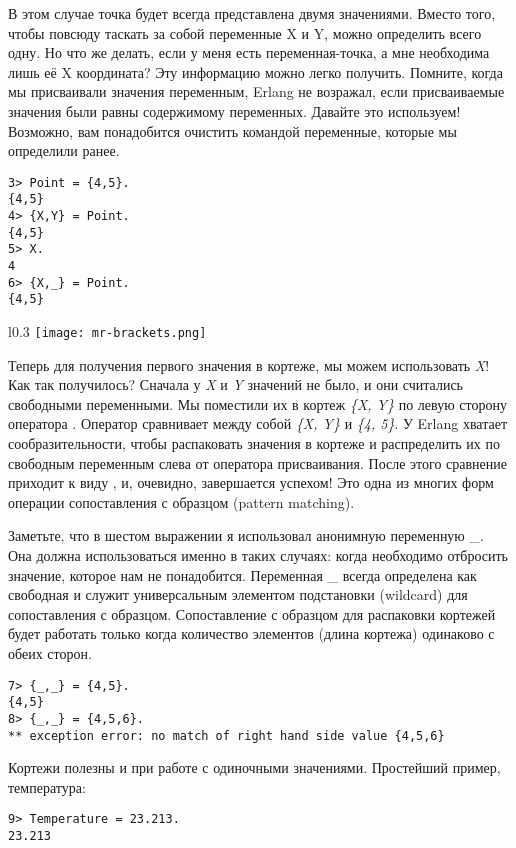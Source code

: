 В этом случае точка будет всегда представлена двумя значениями.
Вместо того, чтобы повсюду таскать за собой переменные X и Y, можно определить всего одну.
Но что же делать, если у меня есть переменная\--точка, а мне необходима лишь её X координата?
Эту информацию можно легко получить.
Помните, когда мы присваивали значения переменным, Erlang не возражал, если присваиваемые значения были равны содержимому переменных.
Давайте это используем!
Возможно, вам понадобится очистить командой  переменные, которые мы определили ранее.
\begin{lstlisting}[style=repl]
3> Point = {4,5}.
{4,5}
4> {X,Y} = Point.
{4,5}
5> X.
4
6> {X,_} = Point.
{4,5}
\end{lstlisting}
\begin{wrapfigure}{l}{0.3\textwidth}
    \texttt{[image: mr-brackets.png]}
\end{wrapfigure}

Теперь для получения первого значения в кортеже, мы можем использовать \emph{X}!
Как так получилось?
Сначала у \emph{X} и \emph{Y} значений не было, и они считались свободными переменными.
Мы поместили их в кортеж \emph{\{X, Y\}} по левую сторону оператора \ops{=}.
Оператор \ops{=} сравнивает между собой \emph{\{X, Y\}} и \emph{\{4, 5\}}.
У Erlang хватает сообразительности, чтобы распаковать значения в кортеже и распределить их по свободным переменным слева от оператора присваивания.
После этого сравнение приходит к виду , и, очевидно, завершается успехом!
Это одна из многих форм операции сопоставления с образцом (pattern matching).

Заметьте, что в шестом выражении я использовал анонимную переменную \_.
Она должна использоваться именно в таких случаях: когда необходимо отбросить значение, которое нам не понадобится.
Переменная \_ всегда определена как свободная и служит универсальным элементом подстановки (wildcard) для сопоставления с образцом.
Сопоставление с образцом для распаковки кортежей будет работать только когда количество элементов (длина кортежа) одинаково с обеих сторон.
\begin{lstlisting}[style=repl]
7> {_,_} = {4,5}.
{4,5}
8> {_,_} = {4,5,6}.
** exception error: no match of right hand side value {4,5,6}
\end{lstlisting}

Кортежи полезны и при работе с одиночными значениями.
Простейший пример, температура:
\begin{lstlisting}[style=repl]
9> Temperature = 23.213.
23.213
\end{lstlisting}


